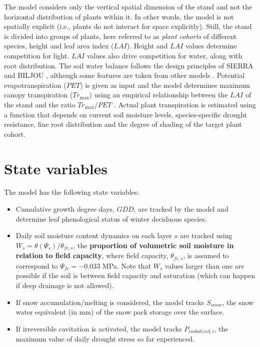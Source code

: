 \documentclass[]{book}
\providecommand{\tightlist}{%
  \setlength{\itemsep}{0pt}\setlength{\parskip}{0pt}}
\begin{document}
The model considers only the vertical spatial dimension of the stand and not the horizontal distribution of
plants within it. In other words, the model is not spatially explicit (i.e., plants do not interact for space explicitly). Still, the stand is divided into groups of plants, here referred to as \emph{plant cohorts} of different species, height and leaf area index (\(LAI\)). Height and \(LAI\) values determine competition for light. \(LAI\) values also drive competition for water, along with root distribution. The soil water balance follows the design principles of SIERRA \citep{Mouillot2001, Ruffault2014, Ruffault2013} and BILJOU \citetext{\citealp{Granier1999}; \citeyear{Granier2007}}, although some features are taken from other models \citep{Kergoat1998}. Potential evapotranspiration (\(PET\)) is given as input and the model determines maximum canopy transpiration (\(Tr_{\max}\)) using an empirical relationship between the \(LAI\) of the stand and the ratio \(Tr_{\max}/PET\) \citep{Granier1999}. Actual plant transpiration is estimated using a function that depends on current soil moisture levels, species-specific drought resistance, fine root distribution and the degree of shading of the target plant cohort.

\hypertarget{state-variables}{%
\section{State variables}\label{state-variables}}

The model has the following state variables:

\begin{itemize}
\tightlist
\item
  Cumulative growth degree days, \(GDD\), are tracked by the model and determine leaf phenological status of winter deciduous species.
\item
  Daily soil moisture content dynamics on each layer \(s\) are tracked using \(W_s = \theta(\Psi_s)/ \theta_{fc,s}\), the \textbf{proportion of volumetric soil moisture in relation to field capacity}, where field capacity, \(\theta_{fc,s}\), is assumed to correspond to \(\Psi_{fc} = -0.033\) MPa. Note that \(W_s\) values larger than one are possible if the soil is between field capacity and saturation (which can happen if deep drainage is not allowed).
\item
  If snow accumulation/melting is considered, the model tracks \(S_{snow}\), the snow water equivalent (in mm) of the snow pack storage over the surface.
\item
  If irreversible cavitation is activated, the model tracks \(P_{embolized,i}\), the maximum value of daily drought stress so far experienced.
\end{itemize}
\end{document}
